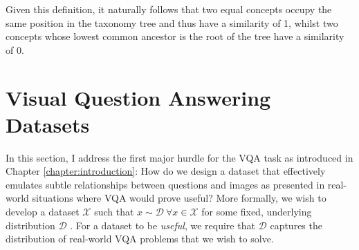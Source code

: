Given this definition, it naturally follows that two equal concepts occupy the same position in the taxonomy tree and thus have a similarity of 1, whilst two concepts whose lowest common ancestor is the root of the tree have a similarity of 0.



\section{Visual Question Answering Datasets}
\label{section:vqa_datasets}

In this section, I address the first major hurdle for the VQA task as introduced in Chapter \ref{chapter:introduction}: How do we design a dataset that effectively emulates subtle relationships between questions and images as presented in real-world situations where VQA would prove useful? More formally, we wish to develop a dataset \(\mathcal{X}\) such that \(x \sim \mathcal{D}\ \forall x \in \mathcal{X}\) for some fixed, underlying distribution \(\mathcal{D}\) \cite{mohri2018foundations}. For a dataset to be \textit{useful}, we require that \(\mathcal{D}\) captures the distribution of real-world VQA problems that we wish to solve.



